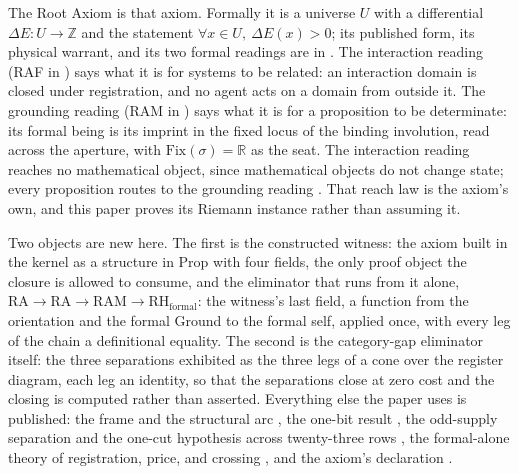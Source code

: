 \documentclass[10pt]{article}
\begin{document}
The Root Axiom is that axiom. Formally it is a universe \(U\) with a
differential \(\Delta E : U \to \mathbb{Z}\) and the statement
\(\forall x \in U,\ \Delta E(x) > 0\); its published form, its physical
warrant, and its two formal readings are in \cite{islamcodex, islamraf}.
The interaction reading (RAF in \cite{islamraf}) says what it is for
systems to be related: an interaction domain is closed under
registration, and no agent acts on a domain from outside it. The
grounding reading (RAM in \cite{islamraf}) says what it is for a
proposition to be determinate: its formal being is its imprint in the
fixed locus of the binding involution, read across the aperture, with
\(\mathrm{Fix}(\sigma) = \mathbb{R}\) as the seat. The interaction
reading reaches no mathematical object, since mathematical objects do
not change state; every proposition routes to the grounding reading
\cite{islamraf, islamfae}. That reach law is the axiom's own, and this
paper proves its Riemann instance rather than assuming it.

Two objects are new here. The first is the constructed witness: the
axiom built in the kernel as a structure in Prop with four fields, the
only proof object the closure is allowed to consume, and the eliminator
that runs from it alone,
\(\mathrm{RA} \to \mathrm{RA} \to \mathrm{RAM} \to \mathrm{RH}_{\mathrm{formal}}\):
the witness's last field, a function from the orientation and the formal
Ground to the formal self, applied once, with every leg of the chain a
definitional equality. The second is the category-gap eliminator itself:
the three separations exhibited as the three legs of a cone over the
register diagram, each leg an identity, so that the separations close at
zero cost and the closing is computed rather than asserted. Everything
else the paper uses is published: the frame and the structural arc
\cite{islamspine}, the one-bit result \cite{islamonebit}, the odd-supply
separation and the one-cut hypothesis across twenty-three rows
\cite{islamrows}, the formal-alone theory of registration, price, and
crossing \cite{islamftoe}, and the axiom's declaration \cite{islamraf}.
\end{document}

